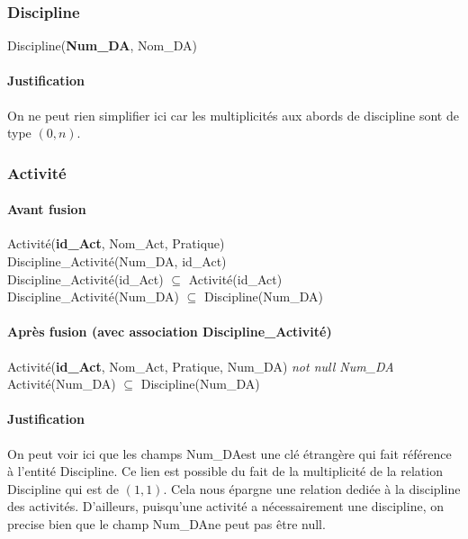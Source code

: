 \documentclass[a4paper, 12pt]{article}
\begin{document}
            \subsubsection{Discipline}
                \noindent Discipline(\textbf{Num\_DA}, Nom\_DA)
                \paragraph{Justification}On ne peut rien simplifier ici car les multiplicités aux abords de discipline sont de type $(0,n)$.

            \subsubsection{Activité}
                \paragraph*{Avant fusion} Activité(\textbf{id\_Act}, Nom\_Act, Pratique) \\
                Discipline\_Activité(Num\_DA, id\_Act) \\
                Discipline\_Activité(id\_Act) $\subseteq$ Activité(id\_Act) \\
                Discipline\_Activité(Num\_DA) $\subseteq$ Discipline(Num\_DA)
                
                \paragraph*{Après fusion (avec association Discipline\_Activité)}
                Activité(\textbf{id\_Act}, Nom\_Act, Pratique, Num\_DA) \textit{not null Num\_DA}  \\ 
                Activité(Num\_DA) $\subseteq$ Discipline(Num\_DA)
                
                \paragraph{Justification}On peut voir ici que les champs \og Num\_DA\fg est une clé étrangère qui fait référence à l'entité Discipline. Ce lien est possible du fait de la multiplicité de la relation Discipline qui est de $(1,1)$. Cela nous épargne une relation dediée à la discipline des activités. D'ailleurs, puisqu'une activité a nécessairement une discipline, on precise bien que le champ \og Num\_DA\fg ne peut pas être null.
\end{document}
